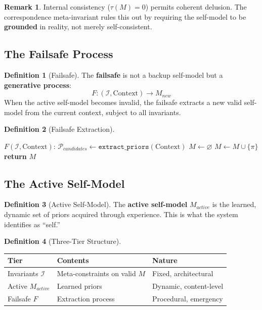 \documentclass[12pt,a4paper]{article}
\theoremstyle{definition}
\newtheorem{definition}{Definition}[section]
\newtheorem{remark}{Remark}[section]
\begin{document}
\begin{remark}
Internal consistency ($\tau(M) = 0$) permits coherent delusion. The correspondence meta-invariant rules this out by requiring the self-model to be \textbf{grounded} in reality, not merely self-consistent.
\end{remark}

\subsection{The Failsafe Process}

\begin{definition}[Failsafe]
The \textbf{failsafe} is not a backup self-model but a \textbf{generative process}:
\[ F: (\mathcal{I}, \text{Context}) \to M_{new} \]
When the active self-model becomes invalid, the failsafe extracts a new valid self-model from the current context, subject to all invariants.
\end{definition}

\begin{definition}[Failsafe Extraction]
\begin{algorithmic}
\STATE $F(\mathcal{I}, \text{Context})$:
\STATE $\mathcal{P}_{candidates} \gets \texttt{extract\_priors}(\text{Context})$
\STATE $M \gets \varnothing$
        \STATE $M \gets M \cup \{\pi\}$
    \ENDIF
\ENDFOR
\STATE \textbf{return} $M$
\end{algorithmic}
\end{definition}

\subsection{The Active Self-Model}

\begin{definition}[Active Self-Model]
The \textbf{active self-model} $M_{active}$ is the learned, dynamic set of priors acquired through experience. This is what the system identifies as ``self.''
\end{definition}

\begin{definition}[Three-Tier Structure]
\begin{center}
\begin{tabular}{|l|l|l|}
\hline
\textbf{Tier} & \textbf{Contents} & \textbf{Nature} \\
\hline
Invariants $\mathcal{I}$ & Meta-constraints on valid $M$ & Fixed, architectural \\
Active $M_{active}$ & Learned priors & Dynamic, content-level \\
Failsafe $F$ & Extraction process & Procedural, emergency \\
\hline
\end{tabular}
\end{center}
\end{definition}
\end{document}
